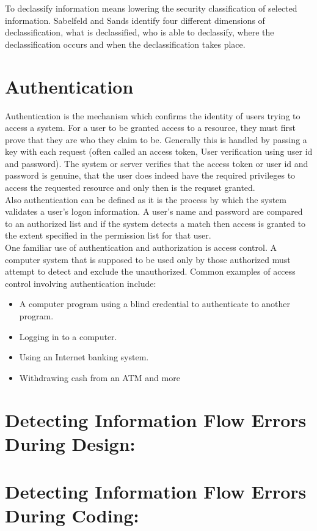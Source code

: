 To declassify information means lowering the security classification of selected information. Sabelfeld and Sands \cite{ref_3_sabelfeld2009declassification} identify four different dimensions of declassification, what is declassified, who is able to declassify, where the declassification occurs and when the declassification takes place.

\section{Authentication}
Authentication is the mechanism which confirms the identity of users trying to access a system. For a user to be granted access to a resource, they must first prove that they are who they claim to be. Generally this is handled by passing a key with each request (often called an access token, User verification using user id and password). The system or server verifies that the access token or user id and password is genuine, that the user does indeed have the required privileges to access the requested resource and only then is the requset granted.\\
Also authentication can be defined as it is the process by which the system validates a user's logon information. A user's name and password are compared to an authorized list and if the system detects a match then access is granted to the extent specified in the permission list for that user.\\

One familiar use of authentication and authorization is access control. A computer system that is supposed to be used only by those authorized must attempt to detect and exclude the unauthorized. Common examples of access control involving authentication include:
\begin{itemize}	
	\item A computer program using a blind credential to authenticate to another program.
	\item Logging in to a computer.	
	\item Using an Internet banking system.
	\item Withdrawing cash from an ATM and more
\end{itemize}

\section{ Detecting Information Flow Errors During Design:}

\section{ Detecting Information Flow Errors During Coding:}
